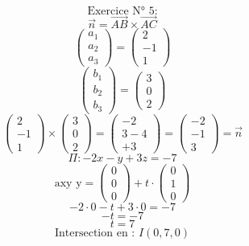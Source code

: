 \documentclass{article}
\begin{document}
\[ \text{Exercice N° 5:} \]
\[ \vec{n} = \vec{AB} \times \vec{AC} \]
\[\begin{pmatrix} a_1 \\ a_2 \\ a_3 \end{pmatrix} = \begin{pmatrix} 2 \\ -1 \\ 1 \end{pmatrix}\]
\[\begin{pmatrix} b_1 \\ b_2 \\ b_3 \end{pmatrix} = \begin{pmatrix} 3 \\ 0 \\ 2 \end{pmatrix}\]
\[ \begin{pmatrix} 2 \\ -1 \\ 1 \end{pmatrix} \times \begin{pmatrix} 3 \\ 0 \\ 2 \end{pmatrix} = \begin{pmatrix} -2 \\ 3-4 \\ +3 \end{pmatrix} = \begin{pmatrix} -2 \\ -1 \\ 3 \end{pmatrix} = \vec{n} \]
\[ \Pi : -2x - y + 3z = -7 \]
\[ \text{axy y} = \begin{pmatrix} 0 \\ 0 \\ 0 \end{pmatrix} + t \cdot \begin{pmatrix} 0 \\ 1 \\ 0 \end{pmatrix} \]
\[ -2 \cdot 0 - t + 3 \cdot 0 = -7 \]
\[ -t = -7 \]
\[ t = 7 \]
\[ \text{Intersection en : } I(0, 7, 0) \]
\end{document}

